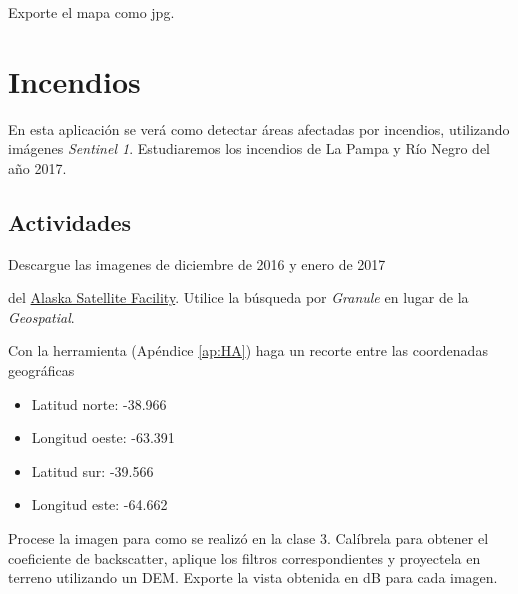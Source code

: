 \begin{que}
    Exporte el mapa como jpg.
\end{que}

\section{Incendios}
En esta aplicación se verá como detectar áreas afectadas por incendios, utilizando imágenes \emph{Sentinel 1}. Estudiaremos los incendios de La Pampa y Río Negro del año 2017.


\subsection{Actividades}

\begin{que}
    Descargue las imagenes de diciembre de 2016 y enero de 2017
    \begin{center}\end{center}
    \begin{center}\end{center}

      del \href{https://vertex.daac.asf.alaska.edu/}{Alaska Satellite Facility}. Utilice la búsqueda por \emph{Granule} en lugar de la \emph{Geospatial}.
\end{que}

\begin{que}
    Con la herramienta  (Apéndice \ref{ap:HA}) haga un recorte entre las coordenadas geográficas
    \begin{itemize}
        \item Latitud norte: -38.966
        \item Longitud oeste: -63.391
        \item Latitud sur: -39.566
        \item Longitud este: -64.662
    \end{itemize}
\end{que}

\begin{que}
    Procese la imagen para como se realizó en la clase 3. Calíbrela para obtener el coeficiente de backscatter, aplique los filtros correspondientes y proyectela en terreno utilizando un DEM. Exporte la vista obtenida en dB para cada imagen.
\end{que}

